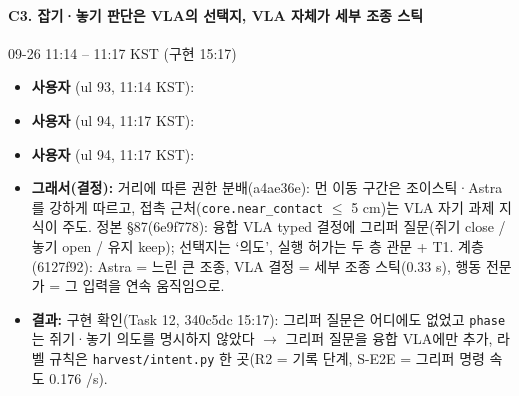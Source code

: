 \paragraph{C3. 잡기·놓기 판단은 VLA의 선택지, VLA 자체가 세부 조종 스틱}
{\small 09-26 11:14 -- 11:17 KST (구현 15:17)}
\begin{itemize}
  \item \textbf{사용자} (ul 93, 11:14 KST): 
  \item \textbf{사용자} (ul 94, 11:17 KST): 
  \item \textbf{사용자} (ul 94, 11:17 KST): 
  \item \textbf{그래서(결정):} 거리에 따른 권한 분배(a4ae36e): 먼 이동 구간은 조이스틱·Astra를 강하게 따르고, 접촉 근처(\texttt{core.\allowbreak{}near\_\allowbreak{}contact} $\leq$ 5 cm)는 VLA 자기 과제 지식이 주도. 정본 §87(6e9f778): 융합 VLA typed 결정에 그리퍼 질문(쥐기 close / 놓기 open / 유지 keep); 선택지는 `의도', 실행 허가는 두 층 관문 + T1. 계층(6127f92): Astra = 느린 큰 조종, VLA 결정 = 세부 조종 스틱(0.33 s), 행동 전문가 = 그 입력을 연속 움직임으로.
  \item \textbf{결과:} 구현 확인(Task 12, 340c5dc 15:17): 그리퍼 질문은 어디에도 없었고 \texttt{phase}는 쥐기·놓기 의도를 명시하지 않았다 $\rightarrow$ 그리퍼 질문을 융합 VLA에만 추가, 라벨 규칙은 \texttt{harvest/\allowbreak{}intent.\allowbreak{}py} 한 곳(R2 = 기록 단계, S-E2E = 그리퍼 명령 속도 0.176 /s).
\end{itemize}

